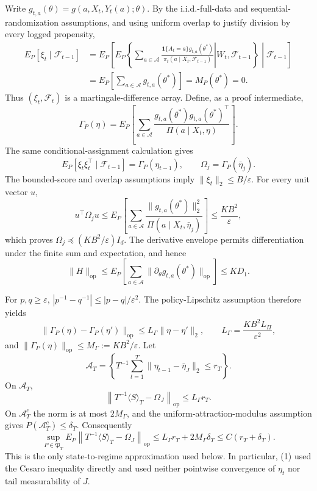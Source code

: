 Write \(g_{t,a}(\theta)=g(a,X_t,Y_t(a);\theta)\). By the i.i.d.-full-data and sequential-randomization assumptions, and using uniform overlap to justify division by every logged propensity,
\[
\begin{aligned}
E_P[\xi_t\mid\mathcal F_{t-1}]
&=E_P\!\left[E_P\!\left\{\left.\sum_{a\in\mathcal A}
 \frac{\mathbf 1\{A_t=a\}g_{t,a}(\theta^*)}
 {\pi_t(a\mid X_t,\mathcal F_{t-1})}\right|W_t,\mathcal F_{t-1}\right\}\middle|\mathcal F_{t-1}\right]\\
&=E_P\!\left[\sum_{a\in\mathcal A}g_{t,a}(\theta^*)\right]
=M_P(\theta^*)=0.
\end{aligned}
\]
Thus \((\xi_t,\mathcal F_t)\) is a martingale-difference array. Define, as a proof intermediate,
\[
 \Gamma_P(\eta)=E_P\!\left[\sum_{a\in\mathcal A}
 \frac{g_{t,a}(\theta^*)g_{t,a}(\theta^*)^\top}
 {\Pi(a\mid X_t,\eta)}\right].
\]
The same conditional-assignment calculation gives
\[
 E_P[\xi_t\xi_t^\top\mid\mathcal F_{t-1}]=\Gamma_P(\eta_{t-1}),
 \qquad \Omega_j=\Gamma_P(\bar\eta_j).
\]
The bounded-score and overlap assumptions imply \(\|\xi_t\|_2\le B/\varepsilon\). For every unit vector \(u\),
\[
 u^\top\Omega_ju
 \le E_P\!\left[\sum_{a\in\mathcal A}
 \frac{\|g_{t,a}(\theta^*)\|_2^2}{\Pi(a\mid X_t,\bar\eta_j)}\right]
 \le \frac{KB^2}{\varepsilon},
\]
which proves \(\Omega_j\preceq(KB^2/\varepsilon)I_d\). The derivative envelope permits differentiation under the finite sum and expectation, and hence
\[
 \|H\|_{\mathrm{op}}
 \le E_P\!\left[\sum_{a\in\mathcal A}\|\partial_\theta g_{t,a}(\theta^*)\|_{\mathrm{op}}\right]
 \le KD_1.
\]

For \(p,q\ge\varepsilon\), \(|p^{-1}-q^{-1}|\le |p-q|/\varepsilon^2\). The policy-Lipschitz assumption therefore yields
\[
 \|\Gamma_P(\eta)-\Gamma_P(\eta')\|_{\mathrm{op}}
 \le L_\Gamma\|\eta-\eta'\|_2,
 \qquad L_\Gamma=\frac{KB^2L_\Pi}{\varepsilon^2},
\]
and \(\|\Gamma_P(\eta)\|_{\mathrm{op}}\le M_\Gamma:=KB^2/\varepsilon\). Let
\[
 \mathcal A_T=\left\{T^{-1}\sum_{t=1}^T
 \|\eta_{t-1}-\bar\eta_J\|_2\le r_T\right\}.
\]
On \(\mathcal A_T\),
\[
 \left\|T^{-1}\langle S\rangle_T-\Omega_J\right\|_{\mathrm{op}}
 \le L_\Gamma r_T.
\]
On \(\mathcal A_T^c\) the norm is at most \(2M_\Gamma\), and the uniform-attraction-modulus assumption gives \(P(\mathcal A_T^c)\le\delta_T\). Consequently
\[
 \sup_{P\in\mathfrak P_T}E_P\left\|T^{-1}\langle S\rangle_T-\Omega_J\right\|_{\mathrm{op}}
 \le L_\Gamma r_T+2M_\Gamma\delta_T
 \le C(r_T+\delta_T).
\tag{1}
\]
This is the only state-to-regime approximation used below. In particular, (1) used the Cesaro inequality directly and used neither pointwise convergence of \(\eta_t\) nor tail measurability of \(J\).

